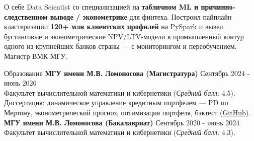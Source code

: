 \documentclass{resume} %
\begin{document}
	\begin{rSection}{О себе}
		Data Scientist со специализацией на \textbf{табличном ML и причинно-следственном выводе /
		эконометрике} для финтеха. Построил пайплайн кластеризации \textbf{120+ млн клиентских профилей}
		на PySpark и вывел бустинговые и эконометрические NPV/LTV-модели в промышленный контур одного из
		крупнейших банков страны --- с мониторингом и переобучением. Магистр ВМК МГУ.
	\end{rSection}

	\begin{rSection}{Образование}
		\textbf{МГУ имени М.В. Ломоносова (Магистратура)} \hfill {Сентябрь 2024 - июнь 2026}\\
		Факультет вычислительной математики и кибернетики (\textit{Средний балл:} 4.5).
		Диссертация: динамическое управление кредитным портфелем --- PD по Мертону, эконометрический
		прогноз, оптимизация портфеля, бэктест
		(\href{https://github.com/MaximKiryakin/credit-portfolio-management}{GitHub}).\\
		\textbf{МГУ имени М.В. Ломоносова (Бакалавриат)} \hfill {Сентябрь 2020 - июнь 2024}\\
		Факультет вычислительной математики и кибернетики (\textit{Средний балл:} 4.3).
	\end{rSection}
\end{document}
